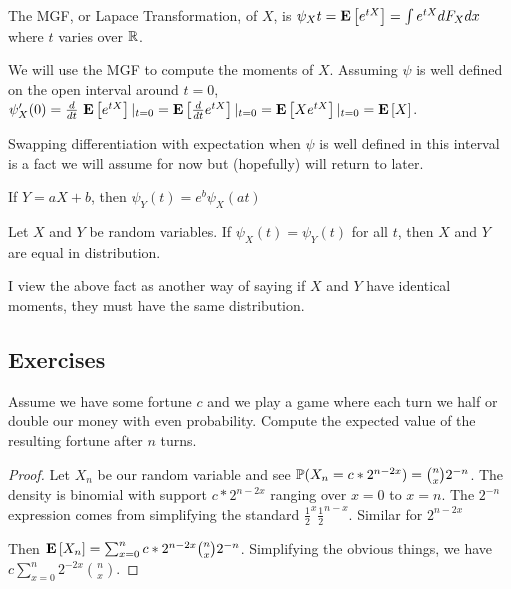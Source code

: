 \documentclass[10pt]{article}
\begin{document}
\begin{definition}
    The MGF, or Lapace Transformation, of $X$, is $\psi_{X}{t} = \E{e^{tX}} =
    \int e^{tX} dF_X dx$ where $t$ varies over $\R$.
\end{definition}

We will use the MGF to compute the moments of $X$. Assuming $\psi$ is well
defined on the open interval around $t=0$, $\psi'_X(0) = \frac{d}{dt}\,\E{e^{tX}}|_{t=0} = \E{\frac{d}{dt}e^{tX}}|_{t=0} = \E{Xe^{tX}}|_{t=0} = \E{X}$.

Swapping differentiation with expectation when $\psi$ is well defined in this
interval is a fact we will assume for now but (hopefully) will return to later.

\begin{theorem}
\item{If $Y = aX + b$, then $\psi_Y(t) = e^b\psi_X(at)$}
\item{}
\end{theorem}

\begin{theorem}
    Let $X$ and $Y$ be random variables. If $\psi_X(t) = \psi_Y(t)$ for all
    $t$, then $X$ and $Y$ are equal in distribution.
\end{theorem}

I view the above fact as another way of saying if $X$ and $Y$ have identical
moments, they must have the same distribution.

\subsection{Exercises}

\setcounter{exercise}{0}
\begin{exercise}
    Assume we have some fortune $c$ and we play a game where each turn we half
    or double our money with even probability. Compute the expected value of
    the resulting fortune after $n$ turns.
\end{exercise}

\begin{proof}
    Let $X_n$ be our random variable and see $\P(X_n = c*2^{n-2x}) =
    \binom{n}{x} 2^{-n} $. The density is binomial with support $c*2^{n-2x}$
    ranging over $x=0$ to $x=n$. The $2^{-n}$ expression comes from simplifying
    the standard $\frac{1}{2}^x \frac{1}{2}^{n-x}$. Similar for $2^{n-2x}$

    Then $\E{X_n} = \sum_{x=0}^n c*2^{n-2x} \binom{n}{x} 2^{-n}$. Simplifying
    the obvious things, we have $c \sum_{x=0}^n 2^{-2x} \binom{n}{x}$.
\end{proof}
\end{document}
